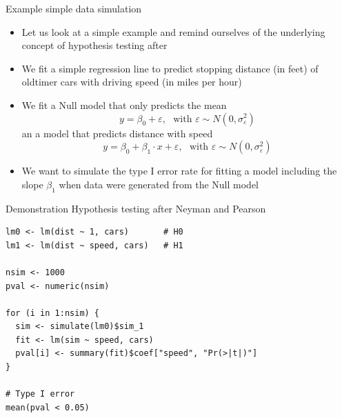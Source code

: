 \documentclass[aspectratio=169]{beamer}
\begin{document}
\begin{frame}{Example simple data simulation}
  \begin{itemize}
    \item Let us look at a simple example and remind ourselves of the underlying
      concept of hypothesis testing after \citet{NeymanPearson33}
    \item We fit a simple regression line to predict stopping distance (in feet)
      of oldtimer cars with driving speed (in miles per hour)
    \item We fit a Null model that only predicts the mean
      \[
        y = \beta_0 + \varepsilon, ~~~\text{with } \varepsilon \sim N(0,
        \sigma^2_{\varepsilon})
      \]
      an a model that predicts distance with speed
      \[
        y = \beta_0 + \beta_1 \cdot x + \varepsilon, ~~~\text{with } \varepsilon
        \sim N(0, \sigma^2_{\varepsilon})
      \]
    \item We want to simulate the type I error rate for fitting a model
      including the slope $\beta_1$ when data were generated from the Null model
  \end{itemize}
\end{frame}

\begin{frame}[fragile]{Demonstration}
  {Hypothesis testing after Neyman and Pearson}
\begin{lstlisting}
lm0 <- lm(dist ~ 1, cars)       # H0
lm1 <- lm(dist ~ speed, cars)   # H1

nsim <- 1000
pval <- numeric(nsim)

for (i in 1:nsim) {
  sim <- simulate(lm0)$sim_1
  fit <- lm(sim ~ speed, cars)
  pval[i] <- summary(fit)$coef["speed", "Pr(>|t|)"]
}

# Type I error
mean(pval < 0.05)
\end{lstlisting}
\end{frame}
\end{document}
